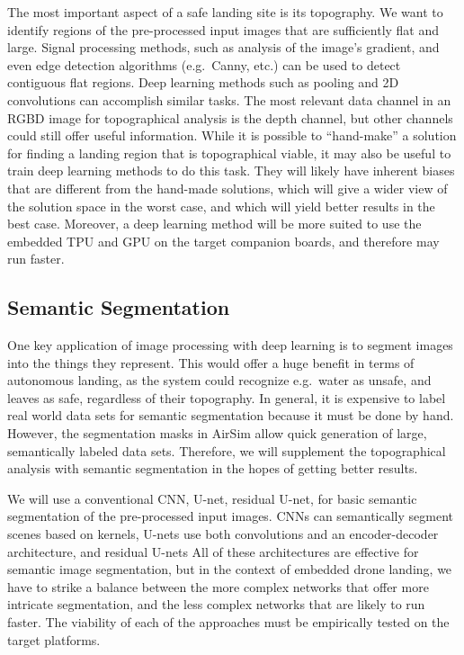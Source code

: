 The most important aspect of a safe landing site is its topography.
We want to identify regions of the pre-processed input images that are sufficiently flat and large.
Signal processing methods, such as analysis of the image's gradient, and even edge detection algorithms (e.g.~Canny, etc.)
can be used to detect contiguous flat regions.
Deep learning methods such as pooling and 2D convolutions can accomplish similar tasks.
The most relevant data channel in an RGBD image for topographical analysis is the depth channel,
but other channels could still offer useful information.
While it is possible to ``hand-make'' a solution for finding a landing region that is topographical viable,
it may also be useful to train deep learning methods to do this task.
They will likely have inherent biases that are different from the hand-made solutions,
which will give a wider view of the solution space in the worst case,
and which will yield better results in the best case.
Moreover, a deep learning method will be more suited to use the embedded TPU and GPU on the target companion boards,
and therefore may run faster.

\subsection{Semantic Segmentation}

One key application of image processing with deep learning is to segment images into the things they represent.
This would offer a huge benefit in terms of autonomous landing, as the system could recognize e.g.~water as unsafe,
and leaves as safe, regardless of their topography.
In general, it is expensive to label real world data sets for semantic segmentation because it must be done by hand.
However, the segmentation masks in AirSim allow quick generation of large, semantically labeled data sets.
Therefore, we will supplement the topographical analysis with semantic segmentation in the hopes of getting better results.

We will use a conventional CNN, U-net, residual U-net, for basic semantic segmentation of the pre-processed input images.
CNNs can semantically segment scenes based on kernels, U-nets use both convolutions and an encoder-decoder architecture,
and residual U-nets
All of these architectures are effective for semantic image segmentation, but in the context of embedded drone landing,
we have to strike a balance between the more complex networks that offer more intricate segmentation,
and the less complex networks that are likely to run faster.
The viability of each of the approaches must be empirically tested on the target platforms.


